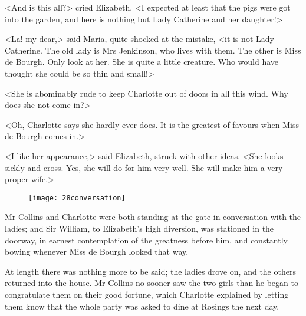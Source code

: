 <And is this all?> cried Elizabeth. <I expected at least that the pigs were got into the garden, and here is nothing but Lady Catherine and her daughter!>

<La! my dear,> said Maria, quite shocked at the mistake, <it is not Lady Catherine. The old lady is Mrs Jenkinson, who lives with them. The other is Miss de Bourgh. Only look at her. She is quite a little creature. Who would have thought she could be so thin and small!>

<She is abominably rude to keep Charlotte out of doors in all this wind. Why does she not come in?>

<Oh, Charlotte says she hardly ever does. It is the greatest of favours when Miss de Bourgh comes in.>

<I like her appearance,> said Elizabeth, struck with other ideas. <She looks sickly and cross. Yes, she will do for him very well. She will make him a very proper wife.>

\begin{figure}[tbh]
\centering
\texttt{[image: 28conversation]}
\end{figure}

Mr Collins and Charlotte were both standing at the gate in conversation with the ladies; and Sir William, to Elizabeth's high diversion, was stationed in the doorway, in earnest contemplation of the greatness before him, and constantly bowing whenever Miss de Bourgh looked that way.

At length there was nothing more to be said; the ladies drove on, and the others returned into the house. Mr Collins no sooner saw the two girls than he began to congratulate them on their good fortune, which Charlotte explained by letting them know that the whole party was asked to dine at Rosings the next day.